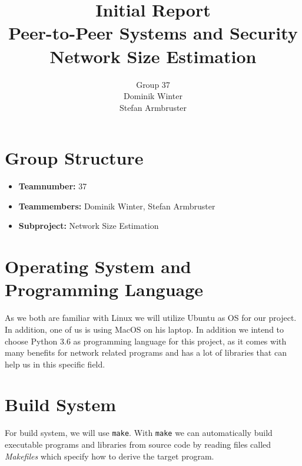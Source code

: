 \documentclass[IN,11pt,twoside,openright,english]{article}
\begin{document}
\title{%
  \Huge \textbf{Initial Report} \\
  \vspace{1.5cm} \large \textbf{Peer-to-Peer Systems and Security} \\
    \vspace{0.5cm} \textbf{Network Size Estimation} \vspace{1cm} }

\author{%
	\large Group 37 \\
	\large Dominik Winter \\ 
	\large Stefan Armbruster}
\date{}
\maketitle

\newpage

\section{Group Structure}

\begin{itemize}
\item \textbf{Teamnumber:} 37
\item \textbf{Teammembers:} Dominik Winter, Stefan Armbruster
\item \textbf{Subproject:} Network Size Estimation
\end{itemize}

\section{Operating System and Programming Language}

As we both are familiar with Linux we will utilize Ubuntu as OS for our project. In addition, one of us is using MacOS on his laptop. 
\newline
\newline
In addition we intend to choose Python 3.6 as programming language for this project, as it comes with many benefits for network related programs and has a lot of libraries that can help us in this specific field.

\section{Build System}

For build system, we will use \texttt{make}. With \texttt{make} we can automatically build executable programs and libraries from source code by reading files called \textit{Makefiles} which specify how to derive the target program.
\end{document}
